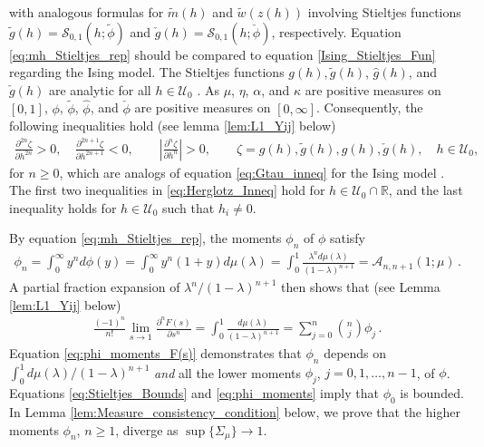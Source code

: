 \documentclass[english,12pt,jmp,graphicx]{revtex4-1}
\newcommand{\ph}{\hat{\phi}}
\begin{document}
%
with analogous formulas for $\tilde{m}(h)$ and $\tilde{w}(z(h))$
involving Stieltjes functions $\tilde{g}(h)=\mathcal{S}_{0,1}(h;\tilde{\phi})$
and $\check{g}(h)=\mathcal{S}_{0,1}(h;\check{\phi})$, respectively. Equation 
\eqref{eq:mh_Stieltjes_rep} should be compared to equation
\eqref{Ising_Stieltjes_Fun} regarding the Ising model. The Stieltjes 
functions $g(h),\tilde{g}(h)$, $\hat{g}(h)$, and $\check{g}(h)$ are
analytic for all $h\in\mathcal{U}_0$ \cite{Golden:CMP-473}.  As $\mu$, $\eta$,
$\alpha$, and $\kappa$ are positive measures on $[0,1]$, $\phi$, $\tilde{\phi}$,
$\ph$, and $\check{\phi}$ are positive measures on $[0,\infty]$. Consequently,
the following inequalities hold (see lemma \ref{lem:L1_Yij} below)
%
\begin{align}\label{eq:Herglotz_Inneq}
  \frac{\partial^{2n}\zeta}{\partial h^{2n}}>0, \quad
  \frac{\partial^{2n+1}\zeta}{\partial h^{2n+1}}<0, \qquad
  \left|\frac{\partial^n\zeta}{\partial h^n}\right|>0, \qquad
  \zeta=g(h),\tilde{g}(h),\hat{g}(h),\check{g}(h), \quad h\in\mathcal{U}_0,
\end{align}
%
for $n\geq0$, which are analogs of equation \eqref{eq:Gtau_inneq} for the
Ising model \cite{Golden:JMP-5627}. The first two inequalities in
\eqref{eq:Herglotz_Inneq} hold for $h\in\mathcal{U}_0\cap\mathbb{R}$, and the
last inequality holds for $h\in\mathcal{U}_0$ such that $h_i\neq0$. 

By equation \eqref{eq:mh_Stieltjes_rep}, the moments $\phi_n$ of $\phi$
satisfy  
%
\begin{align}\label{eq:phi_moments}
  \phi_n=\int_0^\infty y^nd\phi(y)
    =\int_0^\infty y^n(1+y)d\mu(\lambda)
    =\int_0^1\frac{\lambda^nd\mu(\lambda)}{(1-\lambda)^{n+1}}=\mathcal{A}_{n,n+1}(1;\mu)\,.
\end{align}
%
A partial fraction expansion of $\lambda^n/(1-\lambda)^{n+1}$ then shows that (see
Lemma \ref{lem:L1_Yij} below) 
%
\begin{align}\label{eq:phi_moments_F(s)}
  \frac{(-1)^n}{n!}\lim_{s\to1}\frac{\partial^nF(s)}{\partial s^n}=\int_0^1\frac{d\mu(\lambda)}{(1-\lambda)^{n+1}}
                                =\sum_{j=0}^n{n \choose j} \phi_j\,.
\end{align}
%
Equation \eqref{eq:phi_moments_F(s)} demonstrates that $\phi_n$ depends
on $\int_0^1d\mu(\lambda)/(1-\lambda)^{n+1}$ \emph{and} all the lower moments $\phi_j$,
$j=0,1,\ldots,n-1$, of $\phi$. Equations \eqref{eq:Stieltjes_Bounds} and
\eqref{eq:phi_moments} imply that $\phi_0$ is bounded. In Lemma
\ref{lem:Measure_consistency_condition} below, we prove that the  
higher moments $\phi_n$, $n\geq1$, diverge as $\sup\{\Sigma_\mu\}\to1$.
\end{document}
